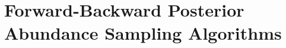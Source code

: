 \documentclass[12pt]{article}
\newcommand{\bG}{\ensuremath{\boldsymbol{\Gamma}}}
\begin{document}
\section{Forward-Backward Posterior Abundance Sampling Algorithms}


%
%
%
\end{document}
